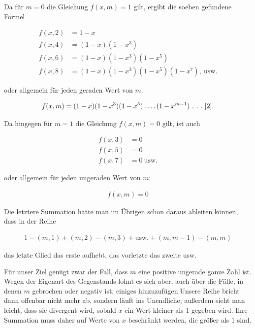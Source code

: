 \clearpage{}

Da für $m=0$ die Gleichung $f(x,m)=1$ gilt, ergibt die soeben gefundene Formel

\[
\begin{aligned}
f(x,2)&=1-x\\
f(x,4)&=(1-x)(1-x^3)\\
f(x,6)&=(1-x)(1-x^3)(1-x^5)\\
f(x,8)&=(1-x)(1-x^3)(1-x^5)(1-x^7),\ \text{usw.}
\end{aligned}
\]

oder allgemein für jeden geraden Wert von $m$:

\[
\begin{aligned}
f(x,m)=(1-x)(1-x^3)(1-x^5)\mathinner{.\,.\,.\,.}(1-x^{m-1})\ .\ .\ .\ [2].
\end{aligned}
\]

Da hingegen für $m=1$ die Gleichung $f(x,m)=0$ gilt, ist auch

\[
\begin{aligned}
f(x,3)&=0\\
f(x,5)&=0\\
f(x,7)&=0\ \text{usw.}
\end{aligned}
\]

oder allgemein für jeden ungeraden Wert von $m$:

\[
\begin{aligned}
f(x,m)=0
\end{aligned}
\]

Die letztere Summation hätte man im Übrigen schon daraus ableiten können, dass in der Reihe

\[
\begin{aligned}
1-(m,1)+(m,2)-(m,3)+\text{usw.}+(m,m-1)-(m,m)
\end{aligned}
\]

das letzte Glied das erste aufhebt, das vorletzte das zweite usw.


Für unser Ziel genügt zwar der Fall, dass $m$ eine positive ungerade ganze Zahl ist. Wegen der Eigenart des Gegenstands lohnt es sich aber, auch über die Fälle, in denen $m$ gebrochen oder negativ ist, einiges hinzuzufügen.\quad Unsere Reihe bricht dann offenbar nicht mehr ab, sondern läuft ins Unendliche; außerdem sieht man leicht, dass sie divergent wird, sobald $x$ ein Wert kleiner als $1$ gegeben wird. Ihre Summation muss daher auf Werte von $x$ beschränkt werden, die größer als $1$ sind.

